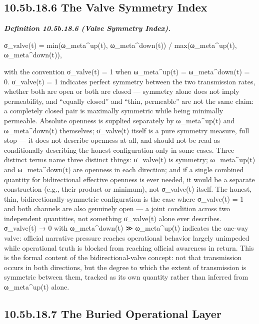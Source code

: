 \documentclass[
]{article}
\begin{document}
\hypertarget{b.18.6-the-valve-symmetry-index}{%
\subsection{10.5b.18.6 The Valve Symmetry
Index}\label{b.18.6-the-valve-symmetry-index}}

\emph{\textbf{Definition 10.5b.18.6 (Valve Symmetry Index).}}

σ\_valve(t) = min(ω\_meta\^{}up(t), ω\_meta\^{}down(t)) /
max(ω\_meta\^{}up(t), ω\_meta\^{}down(t)),

with the convention σ\_valve(t) = 1 when ω\_meta\^{}up(t) =
ω\_meta\^{}down(t) = 0. σ\_valve(t) = 1 indicates perfect symmetry
between the two transmission rates, whether both are open or both are
closed --- symmetry alone does not imply permeability, and ``equally
closed'' and ``thin, permeable'' are not the same claim: a completely
closed pair is maximally symmetric while being minimally permeable.
Absolute openness is supplied separately by ω\_meta\^{}up(t) and
ω\_meta\^{}down(t) themselves; σ\_valve(t) itself is a pure symmetry
measure, full stop --- it does not describe openness at all, and should
not be read as conditionally describing the honest configuration only in
some cases. Three distinct terms name three distinct things: σ\_valve(t)
is symmetry; ω\_meta\^{}up(t) and ω\_meta\^{}down(t) are openness in
each direction; and if a single combined quantity for bidirectional
effective openness is ever needed, it would be a separate construction
(e.g., their product or minimum), not σ\_valve(t) itself. The honest,
thin, bidirectionally-symmetric configuration is the case where
σ\_valve(t) = 1 and both channels are also genuinely open --- a joint
condition across two independent quantities, not something σ\_valve(t)
alone ever describes. σ\_valve(t) → 0 with ω\_meta\^{}down(t) ≫
ω\_meta\^{}up(t) indicates the one-way valve: official narrative
pressure reaches operational behavior largely unimpeded while
operational truth is blocked from reaching official awareness in return.
This is the formal content of the bidirectional-valve concept: not that
transmission occurs in both directions, but the degree to which the
extent of transmission is symmetric between them, tracked as its own
quantity rather than inferred from ω\_meta\^{}up(t) alone.

\hypertarget{b.18.7-the-buried-operational-layer}{%
\subsection{10.5b.18.7 The Buried Operational
Layer}\label{b.18.7-the-buried-operational-layer}}
\end{document}
